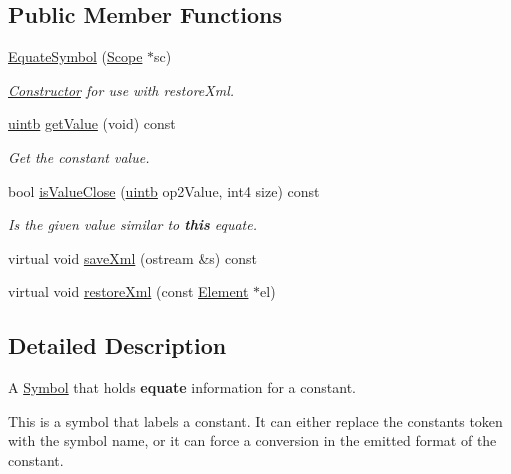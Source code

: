 \subsection*{Public Member Functions}
\begin{DoxyCompactItemize}
\item 
\mbox{\hyperlink{class_equate_symbol_a6bf2ba43204177ae7cb72f5660ba9a55}{Equate\+Symbol}} (\mbox{\hyperlink{class_scope}{Scope}} $\ast$sc)
\begin{DoxyCompactList}\small\item\em \mbox{\hyperlink{class_constructor}{Constructor}} for use with restore\+Xml. \end{DoxyCompactList}\item 
\mbox{\hyperlink{types_8h_a2db313c5d32a12b01d26ac9b3bca178f}{uintb}} \mbox{\hyperlink{class_equate_symbol_a9615feaf12dc1c70c43169756ea25e58}{get\+Value}} (void) const
\begin{DoxyCompactList}\small\item\em Get the constant value. \end{DoxyCompactList}\item 
bool \mbox{\hyperlink{class_equate_symbol_a0e6f232ba80f3b57f66add5315881a4b}{is\+Value\+Close}} (\mbox{\hyperlink{types_8h_a2db313c5d32a12b01d26ac9b3bca178f}{uintb}} op2\+Value, int4 size) const
\begin{DoxyCompactList}\small\item\em Is the given value similar to {\bfseries{this}} equate. \end{DoxyCompactList}\item 
virtual void \mbox{\hyperlink{class_equate_symbol_ac116a5483c48693a6c252687c0319739}{save\+Xml}} (ostream \&s) const
\item 
virtual void \mbox{\hyperlink{class_equate_symbol_ab4aa7cdacdd28777f82bf0be1ad55454}{restore\+Xml}} (const \mbox{\hyperlink{class_element}{Element}} $\ast$el)
\end{DoxyCompactItemize}


\subsection{Detailed Description}
A \mbox{\hyperlink{class_symbol}{Symbol}} that holds {\bfseries{equate}} information for a constant. 

This is a symbol that labels a constant. It can either replace the constant\textquotesingle{}s token with the symbol name, or it can force a conversion in the emitted format of the constant. 

